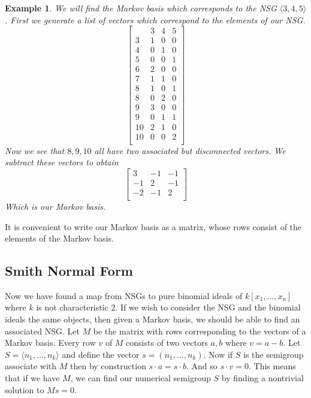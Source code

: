 \documentclass[11pt]{amsart}
\theoremstyle{plain}
\newtheorem{exa}{Example}
\theoremstyle{definition}
\begin{document}
\begin{exa}
  We will find the Markov basis which corresponds to the NSG
$\langle 3,4,5\rangle$. First we generate a list of vectors which correspond
to the elements of our NSG.
\[\left[\begin{array}{r|rrr}
&3&4&5\\
\hline
3&1&0&0\\
4&0&1&0\\
5&0&0&1\\
6&2&0&0\\
7&1&1&0\\
8&1&0&1\\
8&0&2&0\\
9&3&0&0\\
9&0&1&1\\
10&2&1&0\\
10&0&0&2\\
\end{array}\right]
\]
Now we see that $8,9,10$ all have two associated but disconnected vectors. We
subtract these vectors to obtain
\[
  \left[\begin{array}{rrr}
  3&-1&-1\\
  -1&2&-1\\
  -2&-1&2\\
  \end{array}\right]
\]
Which is our Markov basis.
\end{exa}

It is convenient to write our Markov basis as a matrix, whose rows consist of
the elements of the Markov basis.

\subsection{Smith Normal Form}
Now we have found a map from NSGs to pure binomial ideals of $k[x_1,\dots,x_n]$ where $k$ is not characteristic 2. If we wish to consider the NSG and the binomial ideals the same objects, then given a Markov basis, we should be able to find an associated NSG.
Let $M$ be the matrix with rows corresponding to the vectors of a Markov basis.
Every row $v$ of $M$ consists of two vectors $a,b$ where $v=a-b$. Let $S=
\langle n_1,\dots,n_k\rangle$ and define the vector $s=(n_1,\dots,n_k)$. Now
if $S$ is the semigroup associate with $M$ then by  construction $s\cdot a=s\cdot b$. And so $s\cdot v=0$. This means that if we have $M$, we can
find our numerical semigroup $S$ by finding a nontrivial solution to $Ms=0$.
\end{document}
